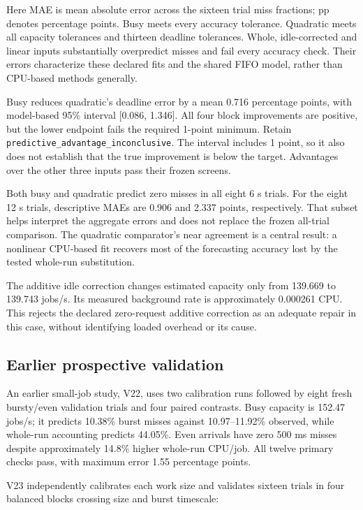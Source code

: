 \documentclass[11pt,a4paper]{article}
\begin{document}
Here MAE is mean absolute error across the sixteen trial miss fractions;
pp denotes percentage points. Busy meets every accuracy tolerance. Quadratic
meets all capacity tolerances and thirteen deadline tolerances. Whole,
idle-corrected and linear inputs substantially overpredict misses and fail
every accuracy check. Their errors characterize these declared fits and the
shared FIFO model, rather than CPU-based methods generally.

Busy reduces quadratic's deadline error by a mean 0.716 percentage points,
with model-based 95\% interval [0.086, 1.346]. All four block improvements are
positive, but the lower endpoint fails the required 1-point minimum. Retain
\texttt{predictive\_advantage\_inconclusive}. The interval includes 1 point, so it
also does not establish that the true improvement is below the target.
Advantages over the other three inputs pass their frozen screens.

Both busy and quadratic predict zero misses in all eight 6 s trials. For
the eight 12 s trials, descriptive MAEs are 0.906 and 2.337 points,
respectively. That subset helps interpret the aggregate errors and does not
replace the frozen all-trial comparison. The quadratic comparator's near
agreement is a central result: a nonlinear CPU-based fit recovers most of
the forecasting accuracy lost by the tested whole-run substitution.

The additive idle correction changes estimated capacity only from 139.669
to 139.743 jobs/s. Its measured background rate is approximately 0.000261
CPU. This rejects the declared zero-request additive correction as an
adequate repair in this case, without identifying loaded overhead or its cause.

\subsection{Earlier prospective validation}

An earlier small-job study, V22, uses two calibration runs followed by eight
fresh bursty/even validation trials and four paired contrasts. Busy capacity
is 152.47 jobs/s; it predicts 10.38\% burst misses against 10.97–11.92\%
observed, while whole-run accounting predicts 44.05\%. Even arrivals have
zero 500 ms misses despite approximately 14.8\% higher whole-run CPU/job.
All twelve primary checks pass, with maximum error 1.55 percentage points.

V23 independently calibrates each work size and validates sixteen trials
in four balanced blocks crossing size and burst timescale:
\end{document}
